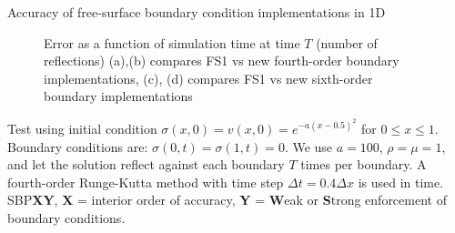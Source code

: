 \documentclass[final]{beamer}
\newlength{\onecolwid}
\newlength{\twocolwid}
\begin{document}
\begin{frame}[t]
\begin{columns}[t]
\begin{column}{\twocolwid}
\begin{columns}[t,totalwidth=\twocolwid]
\begin{column}{\onecolwid}




\end{column} %

\begin{column}{\onecolwid}\vspace{-.6in} %




\end{column} %

\end{columns} %


\begin{alertblock}{Accuracy of free-surface boundary condition implementations in 1D}
  \begin{figure}
    \caption{Error as a function of simulation time at time $T$ (number of reflections) (a),(b) compares FS1 vs new fourth-order boundary
    implementations, (c), (d) compares FS1 vs new sixth-order boundary implementations}
  \end{figure}
  Test using initial condition $\sigma(x,0) = v(x,0) = e^{-a(x-0.5)^2}$ for $0 \leq x \leq 1$. Boundary conditions are:
  $\sigma(0,t) = \sigma(1,t) = 0$. We use $a = 100$, $\rho = \mu = 1$, and let the solution reflect against each boundary
  $T$ times per boundary. A fourth-order Runge-Kutta method with time step $\Delta t = 0.4\Delta x$ is used in time.
  SBP\textbf{X}\textbf{Y}, \textbf{X} = interior order of accuracy, \textbf{Y} = \textbf{W}eak or \textbf{S}trong enforcement of boundary conditions.
            

\end{alertblock}
\end{column}
\end{columns}
\end{frame}
\end{document}
